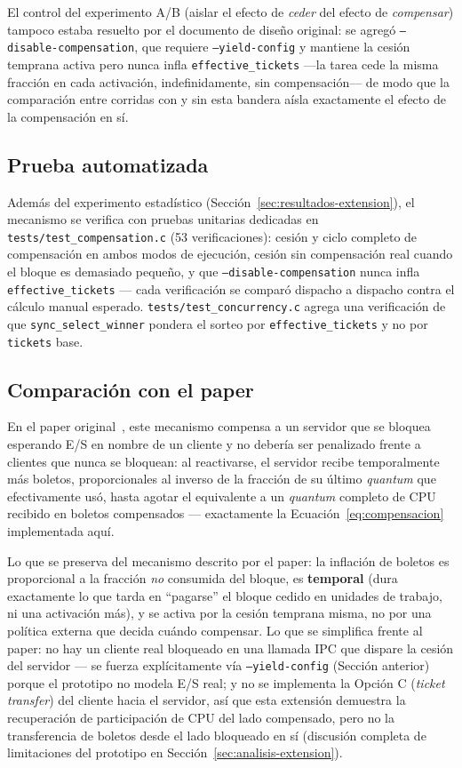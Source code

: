 El control del experimento A/B (aislar el efecto de \emph{ceder} del efecto
de \emph{compensar}) tampoco estaba resuelto por el documento de diseño
original: se agregó \texttt{--disable-compensation}, que requiere
\texttt{--yield-config} y mantiene la cesión temprana activa pero nunca
infla \texttt{effective\_tickets} ---la tarea cede la misma fracción en cada
activación, indefinidamente, sin compensación--- de modo que la comparación
entre corridas con y sin esta bandera aísla exactamente el efecto de la
compensación en sí.

\subsection{Prueba automatizada}

Además del experimento estadístico (Sección~\ref{sec:resultados-extension}),
el mecanismo se verifica con pruebas unitarias dedicadas en
\texttt{tests/test\_compensation.c} (53 verificaciones): cesión y ciclo
completo de compensación en ambos modos de ejecución, cesión sin
compensación real cuando el bloque es demasiado pequeño, y que
\texttt{--disable-compensation} nunca infla \texttt{effective\_tickets} ---
cada verificación se comparó dispacho a dispacho contra el cálculo manual
esperado. \texttt{tests/test\_concurrency.c} agrega una verificación de que
\texttt{sync\_select\_winner} pondera el sorteo por
\texttt{effective\_tickets} y no por \texttt{tickets} base.

\subsection{Comparación con el paper}

En el paper original~\cite{Waldspurger1994}, este mecanismo compensa a un
servidor que se bloquea esperando E/S en nombre de un cliente y no debería
ser penalizado frente a clientes que nunca se bloquean: al reactivarse, el
servidor recibe temporalmente más boletos, proporcionales al inverso de la
fracción de su último \textit{quantum} que efectivamente usó, hasta agotar
el equivalente a un \textit{quantum} completo de CPU recibido en boletos
compensados --- exactamente la Ecuación~\ref{eq:compensacion} implementada
aquí.

Lo que se preserva del mecanismo descrito por el paper: la inflación de
boletos es proporcional a la fracción \emph{no} consumida del bloque, es
\textbf{temporal} (dura exactamente lo que tarda en ``pagarse'' el bloque
cedido en unidades de trabajo, ni una activación más), y se activa por la
cesión temprana misma, no por una política externa que decida cuándo
compensar. Lo que se simplifica frente al paper: no hay un cliente real
bloqueado en una llamada IPC que dispare la cesión del servidor --- se
fuerza explícitamente vía \texttt{--yield-config} (Sección anterior) porque
el prototipo no modela E/S real; y no se implementa la Opción C
(\textit{ticket transfer}) del cliente hacia el servidor, así que esta
extensión demuestra la recuperación de participación de CPU del lado
compensado, pero no la transferencia de boletos desde el lado bloqueado en
sí (discusión completa de limitaciones del prototipo en
Sección~\ref{sec:analisis-extension}).

